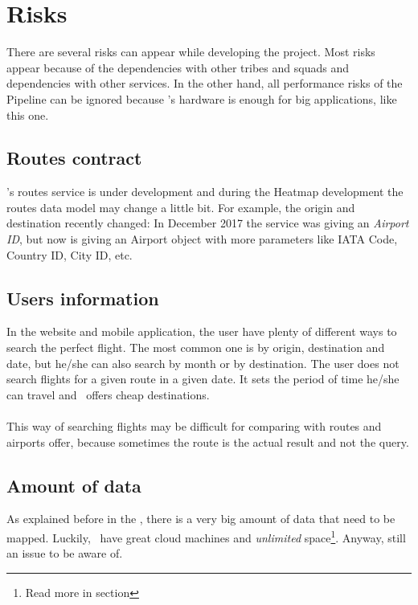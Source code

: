 
\section{Risks}

There are several risks can appear while developing the project. Most risks appear because of the dependencies with other tribes and squads and dependencies with other services. In the other hand, all performance risks of the Pipeline can be ignored because \company's hardware is enough for big applications, like this one.

\subsection{Routes contract}

\squad's routes service is under development and during the Heatmap development the routes data model may change a little bit. For example, the origin and destination recently changed: In December 2017 the service was giving an \textit{Airport ID}, but now is giving an Airport object with more parameters like IATA Code\cite{iata_code}, Country ID, City ID, etc.

\subsection{Users information}

In the website and mobile application, the user have plenty of different ways to search the perfect flight. The most common one is by origin, destination and date, but he/she can also search by month or by destination. The user does not search flights for a given route in a given date. It sets the period of time he/she can travel and \company\ offers cheap destinations.
\\\\
This way of searching flights may be difficult for comparing with routes and airports offer, because sometimes the route is the actual result and not the query.

\subsection{Amount of data}

As explained before in the , there is a very big amount of data that need to be mapped. Luckily, \company\ have great cloud machines and \textit{unlimited} space\footnote{Read more in section }. Anyway, still an issue to be aware of.

